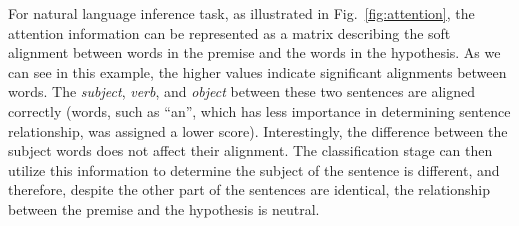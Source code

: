 For natural language inference task, as illustrated in Fig.~\ref{fig:attention}, the attention information can be represented as a matrix describing the soft alignment between words in the premise and the words in the hypothesis. As we can see in this example, the higher values indicate significant alignments between words. The \emph{subject}, \emph{verb}, and \emph{object} between these two sentences are aligned correctly (words, such as ``an'', which has less importance in determining sentence relationship, was assigned a lower score). Interestingly, the difference between the subject words does not affect their alignment. The classification stage can then utilize this information to determine the subject of the sentence is different, and therefore, despite the other part of the sentences are identical, the relationship between the premise and the hypothesis is neutral.


